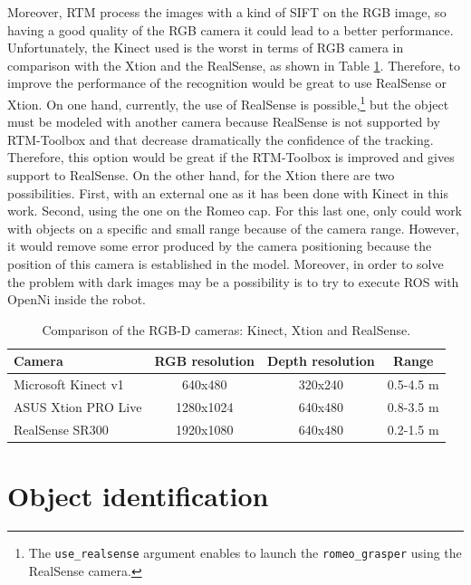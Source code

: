 \documentclass[12pt,a4paper,final,twoside,openright]{report}
\begin{document}
Moreover, RTM process the images with a kind of SIFT on the RGB image, so having a good quality of the RGB camera it could lead to a better performance. Unfortunately, the Kinect used is the worst in terms of RGB camera in comparison with the Xtion and the RealSense, as shown in Table \ref{tab:camera_comparison}. Therefore, to improve the performance of the recognition would be great to use RealSense or Xtion. On one hand, currently, the use of RealSense is possible,\footnote{The \texttt{use\_realsense} argument enables to launch the \texttt{romeo\_grasper} using the RealSense camera.} but the object must be modeled with another camera because RealSense is not supported by RTM-Toolbox and that decrease dramatically the confidence of the tracking. Therefore, this option would be great if the RTM-Toolbox is improved and gives support to RealSense. On the other hand, for the Xtion there are two possibilities. First, with an external one as it has been done with Kinect in this work. Second, using the one on the Romeo cap. For this last one, only could work with objects on a specific and small range because of the camera range. However, it would remove some error produced by the camera positioning because the position of this camera is established in the model. Moreover, in order to solve the problem with dark images may be a possibility is to try to execute ROS with OpenNi inside the robot.  

\begin{table}[h]
\begin{center}
\begin{tabular}{|l|c|c|c|}
\hline
\textbf{Camera} & \textbf{RGB resolution} & \textbf{Depth resolution} & \textbf{Range} \\ \hline
Microsoft Kinect v1 \cite{Smeenk}& 640x480 & 320x240 & 0.5-4.5 m \\
ASUS Xtion PRO Live \cite{ASUSWeb}& 1280x1024 & 640x480 & 0.8-3.5 m \\
RealSense SR300 \cite{IntelWeb}& 1920x1080 & 640x480 & 0.2-1.5 m \\ \hline
\end{tabular}
\caption{Comparison of the RGB-D cameras: Kinect, Xtion and RealSense.\label{tab:camera_comparison}}
\end{center}
\end{table}

\vspace{-10pt}
\section{Object identification}
\label{sec:object_ident}
\end{document}
